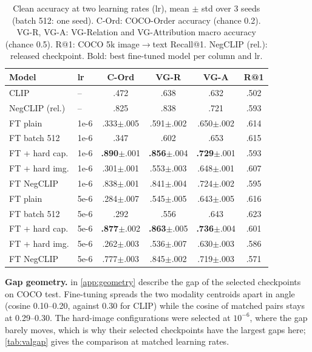\documentclass{article}
\begin{document}
\begin{table}[t]
\caption{Clean accuracy at two learning rates (lr), mean $\pm$ std over 3 seeds (batch 512: one seed). C-Ord: COCO-Order accuracy (chance 0.2). VG-R, VG-A: VG-Relation and VG-Attribution macro accuracy (chance 0.5). R@1: COCO 5k image$\to$text Recall@1. NegCLIP (rel.): released checkpoint. Bold: best fine-tuned model per column and lr.}
\label{tab:matched}
\begin{center}
\begin{small}
\setlength{\tabcolsep}{2.6pt}
\begin{tabular}{llcccc}
\toprule
Model & lr & C-Ord & VG-R & VG-A & R@1 \\
\midrule
CLIP & -- & .472 & .638 & .632 & .502 \\
NegCLIP (rel.) & -- & .825 & .838 & .721 & .593 \\
\midrule
FT plain & 1e-6 & .333\tiny{$\pm$.005} & .591\tiny{$\pm$.002} & .650\tiny{$\pm$.002} & .614 \\
FT batch 512 & 1e-6 & .347 & .602 & .653 & .615 \\
FT + hard cap. & 1e-6 & \textbf{.890}\tiny{$\pm$.001} & \textbf{.856}\tiny{$\pm$.004} & \textbf{.729}\tiny{$\pm$.001} & .593 \\
FT + hard img. & 1e-6 & .301\tiny{$\pm$.001} & .553\tiny{$\pm$.003} & .648\tiny{$\pm$.001} & .607 \\
FT NegCLIP & 1e-6 & .838\tiny{$\pm$.001} & .841\tiny{$\pm$.004} & .724\tiny{$\pm$.002} & .595 \\
\midrule
FT plain & 5e-6 & .284\tiny{$\pm$.007} & .545\tiny{$\pm$.005} & .643\tiny{$\pm$.005} & .616 \\
FT batch 512 & 5e-6 & .292 & .556 & .643 & .623 \\
FT + hard cap. & 5e-6 & \textbf{.877}\tiny{$\pm$.002} & \textbf{.863}\tiny{$\pm$.005} & \textbf{.736}\tiny{$\pm$.004} & .601 \\
FT + hard img. & 5e-6 & .262\tiny{$\pm$.003} & .536\tiny{$\pm$.007} & .630\tiny{$\pm$.003} & .586 \\
FT NegCLIP & 5e-6 & .777\tiny{$\pm$.003} & .845\tiny{$\pm$.002} & .719\tiny{$\pm$.003} & .571 \\
\bottomrule
\end{tabular}
\end{small}
\end{center}
\vskip -0.15in
\end{table}

\textbf{Gap geometry.}  in \cref{app:geometry} describe the gap of the selected checkpoints on COCO test. Fine-tuning spreads the two modality centroids apart in angle (cosine 0.10--0.20, against 0.30 for CLIP) while the cosine of matched pairs stays at 0.29--0.30. The hard-image configurations were selected at $10^{-6}$, where the gap barely moves, which is why their selected checkpoints have the largest gaps here; \cref{tab:valgap} gives the comparison at matched learning rates.
\end{document}
